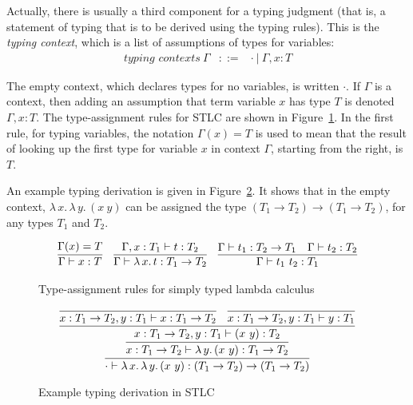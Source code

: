 \documentclass{article}
\begin{document}
Actually, there is usually a third component for a typing judgment (that is,
a statement of typing that is to be derived using the typing rules).  This
is the \emph{typing context}, which is a list of assumptions of types for
variables:
\begin{eqnarray*}
\textit{typing contexts}\ \Gamma & ::= & \cdot\ |\ \Gamma, x : T
\end{eqnarray*}

\noindent The empty context, which declares types for no variables, is
written $\cdot$.  If $\Gamma$ is a context, then adding an assumption
that term variable $x$ has type $T$ is denoted $\Gamma,x : T$.  The
type-assignment rules for STLC are shown in Figure~\ref{fig:stlc}.  In
the first rule, for typing variables, the notation $\Gamma(x) = T$ is
used to mean that the result of looking up the first type for variable
$x$ in context $\Gamma$, starting from the right, is $T$.  

An example typing derivation is given in Figure~\ref{fig:stlcex}.  It
shows that in the empty context, $\lambda\,x.\,\lambda\,y.\,(x\ y)$
can be assigned the type $(T_1\to T_2)\to (T_1\to T_2)$, for any types
$T_1$ and $T_2$.

\begin{figure}
\[
\begin{array}{lll}
\infer{\Gamma\vdash x : T}{\Gamma(x) = T} 

&

\infer{\Gamma\vdash \lambda\,x.\,t : T_1 \to T_2}
      {\Gamma,x:T_1\vdash t:T_2}

&

\infer{\Gamma\vdash t_1\ t_2 : T_1}
      {\Gamma\vdash t_1 : T_2 \to T_1 &
       \Gamma\vdash t_2 : T_2}

\end{array}
\]
\caption{Type-assignment rules for simply typed lambda calculus}
\label{fig:stlc}
\end{figure}


\begin{figure}
\[
\infer{\cdot \vdash \lambda\,x.\, \lambda\,y.\,(x\ y) : (T_1\to T_2)\to
(T_1\to T_2)}
      {\infer{x:T_1 \to T_2 \vdash \lambda\,y.\,(x\ y) : T_1\to T_2}
             {\infer{x:T_1 \to T_2, y:T_1 \vdash (x\ y) : T_2}
                    {\infer{x:T_1 \to T_2, y:T_1 \vdash x : T_1 \to T_2}{\ } &
                     \infer{x:T_1 \to T_2, y:T_1 \vdash y : T_1}{\ }}}}
\]
\caption{Example typing derivation in STLC}
\label{fig:stlcex}
\end{figure}
\end{document}

